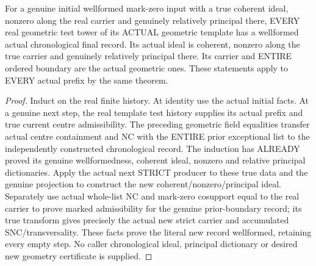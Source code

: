 \begin{theorem}
\label{hir:sharp-actual-finite-chronological-history-genuine-geometry}
\leanok
For a genuine initial wellformed mark-zero input with a true coherent ideal,
nonzero along the real carrier and genuinely relatively principal there,
EVERY real geometric test tower of its ACTUAL geometric template has a
wellformed actual chronological final record. Its actual ideal is coherent,
nonzero along the true carrier and genuinely relatively principal there.
Its carrier and ENTIRE ordered boundary are the actual geometric ones.
These statements apply to EVERY actual prefix by the same theorem.
\end{theorem}
\begin{proof}
Induct on the real finite history. At identity use the actual initial facts.
At a genuine next step, the real template test history supplies its actual
prefix and true current centre admissibility. The preceding geometric field
equalities transfer actual centre containment and NC with the ENTIRE prior
exceptional list to the independently constructed chronological record.
The induction has ALREADY proved its genuine wellformedness, coherent ideal,
nonzero and relative principal dictionaries. Apply the actual next STRICT
producer to these true data and the genuine projection to construct the new
coherent/nonzero/principal ideal. Separately use actual whole-list NC and
mark-zero cosupport equal to the real carrier to prove marked admissibility
for the genuine prior-boundary record; its true transform gives precisely
the actual new strict carrier and accumulated SNC/transversality. These facts
prove the literal new record wellformed, retaining every empty step. No
caller chronological ideal, principal dictionary or desired new geometry
certificate is supplied.
\end{proof}

